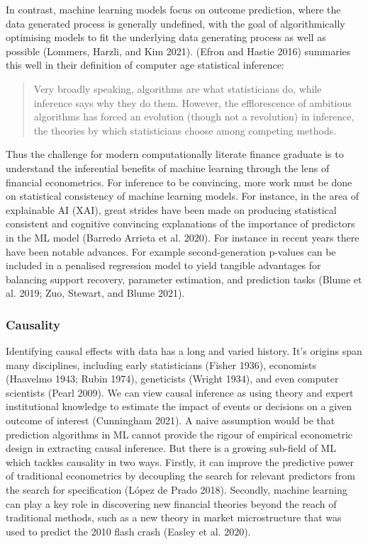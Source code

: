 \documentclass{article}
\begin{document}
In contrast, machine learning models focus on outcome prediction, where
the data generated process is generally undefined, with the goal of
algorithmically optimising models to fit the underlying data generating
process as well as possible (Lommers, Harzli, and Kim 2021). (Efron and
Hastie 2016) summaries this well in their definition of computer age
statistical inference:

\begin{quote}
Very broadly speaking, algorithms are what statisticians do, while
inference says why they do them. However, the efflorescence of ambitious
algorithms has forced an evolution (though not a revolution) in
inference, the theories by which statisticians choose among competing
methods.
\end{quote}

Thus the challenge for modern computationally literate finance graduate
is to understand the inferential benefits of machine learning through
the lens of financial econometrics. For inference to be convincing, more
work must be done on statistical consistency of machine learning models.
For instance, in the area of explainable AI (XAI), great strides have
been made on producing statistical consistent and cognitive convincing
explanations of the importance of predictors in the ML model (Barredo
Arrieta et al. 2020). For instance in recent years there have been
notable advances. For example second-generation p-values can be included
in a penalised regression model to yield tangible advantages for
balancing support recovery, parameter estimation, and prediction tasks
(Blume et al. 2019; Zuo, Stewart, and Blume 2021).

\hypertarget{causality}{%
\subsubsection{Causality}\label{causality}}

Identifying causal effects with data has a long and varied history. It's
origins span many disciplines, including early statisticians (Fisher
1936), economists (Haavelmo 1943; Rubin 1974), geneticists (Wright
1934), and even computer scientists (Pearl 2009). We can view causal
inference as using theory and expert institutional knowledge to estimate
the impact of events or decisions on a given outcome of interest
(Cunningham 2021). A naive assumption would be that prediction
algorithms in ML cannot provide the rigour of empirical econometric
design in extracting causal inference. But there is a growing sub-field
of ML which tackles causality in two ways. Firstly, it can improve the
predictive power of traditional econometrics by decoupling the search
for relevant predictors from the search for specification (López de
Prado 2018). Secondly, machine learning can play a key role in
discovering new financial theories beyond the reach of traditional
methods, such as a new theory in market microstructure that was used to
predict the 2010 flash crash (Easley et al. 2020).
\end{document}
